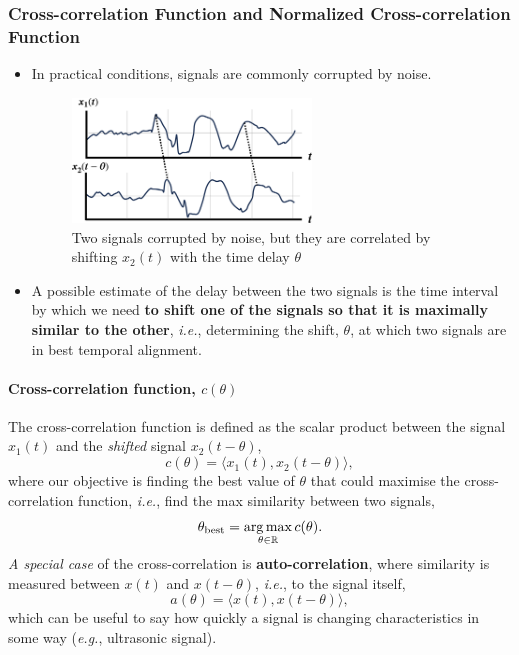 \subsubsection{Cross-correlation Function and Normalized Cross-correlation Function}
\begin{itemize}
    \item In practical conditions, signals are commonly corrupted by noise. 
    \begin{figure}[H]
        \centering 
        \includegraphics[width=0.6\textwidth]{images/correlation.eps}
        \caption{Two signals corrupted by noise, but they are correlated by shifting $x_2(t)$ with the time delay $\theta$} 
    \end{figure}
    
    \item A possible estimate of the delay between the two signals is the time interval by which we need \textbf{to shift one of the signals so that it is maximally similar to the other}, \textit{i.e.}, determining the shift, $\theta$, at which two signals are in best temporal alignment.
\end{itemize}

\paragraph{Cross-correlation function, $c(\theta)$} The cross-correlation function is defined as the scalar product between the signal $x_1(t)$ and the \textit{shifted} signal $x_2(t-\theta)$,
\[
    c(\theta) = \langle x_1(t), x_2(t-\theta) \rangle,
\]
where our objective is finding the best value of $\theta$ that could maximise the cross-correlation function, \textit{i.e.}, find the max similarity between two signals,
\[
    \theta_{\text{best}} = \operatorname*{arg\,max}_{\theta \in \mathbb{R}} c(\theta).
\]
\textit{A special case} of the cross-correlation is \textbf{auto-correlation}, where similarity is measured between $x(t)$ and $x(t-\theta)$, \textit{i.e.}, to the signal itself,
\[
    a(\theta) = \langle x(t), x(t-\theta) \rangle,
\]
which can be useful to say how quickly a signal is changing characteristics in some way (\textit{e.g.}, ultrasonic signal).

